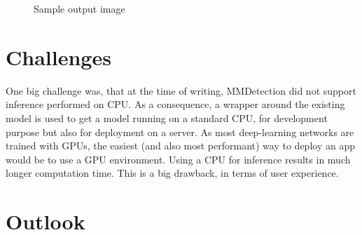\documentclass[a4paper,10pt,hidelinks]{scrartcl}
\begin{document}
\begin{figure}[!h]
	\caption{\label{fig:output-image} Sample output image}
\end{figure}

\section{\fontsize{14}{16}\selectfont Challenges}

One big challenge was, that at the time of writing, MMDetection did not support inference performed on CPU. As a consequence, a wrapper around the existing model is used to get a model running on a standard CPU, for development purpose but also for deployment on a server. As most deep-learning networks are trained with GPUs, the easiest (and also most performant) way to deploy an app would be to use a GPU environment. Using a CPU for inference results in much longer computation time. This is a big drawback, in terms of user experience.

\section{\fontsize{14}{16}\selectfont Outlook}
\end{document}

